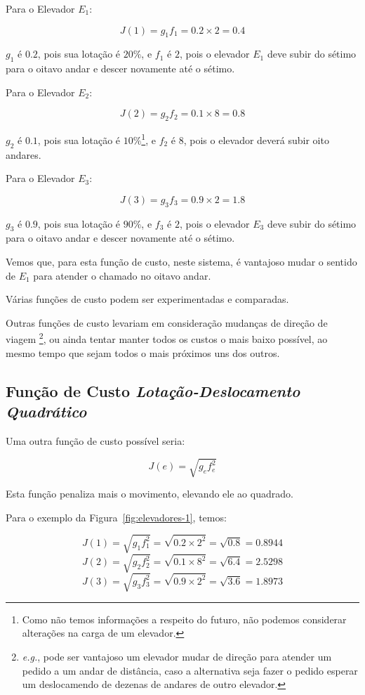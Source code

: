 Para o Elevador $E_{1}$:

\[J(1) = g_{1}f_{1} = 0.2 \times 2 = 0.4\]

$g_{1}$ é $0.2$, pois sua lotação é $20\%$, e $f_{1}$ é $2$, pois o elevador
$E_{1}$ deve subir do sétimo para o oitavo andar e descer novamente até o sétimo.

Para o Elevador $E_{2}$:

\[J(2) = g_{2}f_{2} = 0.1 \times 8 = 0.8\]

$g_{2}$ é $0.1$, pois sua lotação é $10\%$\footnote{Como não temos informações a
respeito do futuro, não podemos considerar alterações na carga de um elevador.},
e $f_{2}$ é $8$, pois o elevador deverá subir oito andares.

Para o Elevador $E_{3}$:

\[J(3) = g_{3}f_{3} = 0.9 \times 2 = 1.8\]

$g_{3}$ é $0.9$, pois sua lotação é $90\%$, e $f_{3}$ é $2$, pois o elevador
$E_{3}$ deve subir do sétimo para o oitavo andar e descer novamente até o sétimo.

Vemos que, para esta função de custo, neste sistema, é vantajoso mudar o sentido
de $E_{1}$ para atender o chamado no oitavo andar.

Várias funções de custo podem ser experimentadas e comparadas.

Outras funções de custo levariam em consideração mudanças de direção de viagem
\footnote{\textit{e.g.}, pode ser vantajoso um elevador mudar de direção para atender um
pedido a um andar de distância, caso a alternativa seja fazer o pedido esperar
um deslocamendo de dezenas de andares de outro elevador.}, ou ainda tentar
manter todos os custos o mais baixo possível, ao mesmo tempo que sejam todos o
mais próximos uns dos outros.

\subsection{\label{sec:ai:lotacaoquadratica}Função de Custo
\textit{Lotação-Deslocamento Quadrático}}

Uma outra função de custo possível seria:

\[J(e) = \sqrt{g_{e}f_{e}^{2}}\]

Esta função penaliza mais o movimento, elevando ele ao quadrado.

Para o exemplo da Figura~\ref{fig:elevadores-1}, temos:

\[J(1) = \sqrt{g_{1}f_{1}^{2}} = \sqrt{0.2 \times 2^2} = \sqrt{0.8} = 0.8944\]
\[J(2) = \sqrt{g_{2}f_{2}^{2}} = \sqrt{0.1 \times 8^2} = \sqrt{6.4} = 2.5298\]
\[J(3) = \sqrt{g_{3}f_{3}^{2}} = \sqrt{0.9 \times 2^2} = \sqrt{3.6} = 1.8973\]

